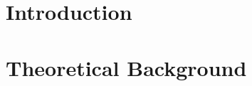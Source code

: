 \documentclass[12pt]{report}
\begin{document}
		
	\vfill
	
	\newpage %
	\thispagestyle{empty}
	\mbox{}
	


\tableofcontents
\thispagestyle{fancy}

\newpage %
\thispagestyle{empty}
\mbox{}

\listoffigures
\thispagestyle{fancy}

\newpage %
\thispagestyle{empty}
\mbox{}

\listoftables
\thispagestyle{fancy}

\newpage %
\thispagestyle{empty}
\mbox{}

\printunsrtglossary[type=symbols,style=long,title={List of abbreviations}]
%


\clearpage
{} %


\chapter{Introduction}
\label{chap:Introduction}


\chapter{Theoretical Background}
\label{chap:TheoreticalBackground}
%

\label{chap:StateArt}
%
\end{document}
